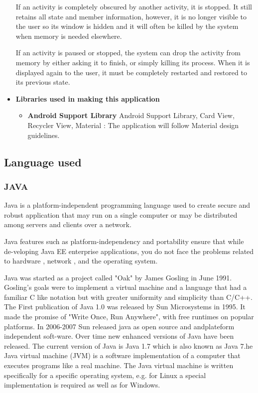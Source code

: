 \begin{itemize}
If an activity is completely obscured by another activity, it is stopped. It still
retains all state and member information, however, it is no longer visible to
the user so its window is hidden and it will often be killed by the system when
memory is needed elsewhere.

If an activity is paused or stopped, the system can drop the activity from memory by either asking it to finish, or simply killing its process. When it is displayed again to the user, it must be completely restarted and restored to its previous state.


\item \textbf{Libraries used in making this application}

\begin{itemize}
	\item \textbf{Android Support Library}
Android Support Library, Card View, Recycler View, Material : The application will
follow Material design guidelines.

\end{itemize}

\end{itemize}

\subsection{Language used}
\subsubsection{JAVA}

Java is a platform-independent programming language used to create secure
and robust application that may run on a single computer or may be distributed
among servers and clients over a network.

Java features such as platform-independency and portability ensure that while
de-veloping Java EE enterprise applications, you do not face the problems
related to hardware , network , and the operating system.

Java was started as a project called "Oak" by James Gosling in June 1991.
Gosling's goals were to implement a virtual machine and a language that had a
familiar C like notation but with greater uniformity and simplicity than C/C++.
The First publication of Java 1.0 was released by Sun Microsystems in 1995. It
made the promise of "Write Once, Run Anywhere", with free runtimes on
popular platforms. In 2006-2007 Sun released java as open source and
andplateform independent soft-ware. Over time new enhanced versions of Java
have been released. The current version of Java is Java 1.7 which is also
known as Java 7.he Java virtual machine (JVM) is a software implementation of
a computer that executes programs like a real machine. The Java virtual
machine is written specifically for a specific operating system, e.g. for Linux a
special implementation is required as well as for Windows.


